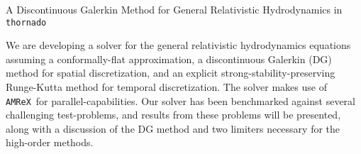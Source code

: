 \documentclass{article}
\newcommand{\thornado}{\texttt{thornado}}
\newcommand{\amrex}{\texttt{AMReX}}
\begin{document}
\begin{center}
A Discontinuous Galerkin Method for General Relativistic Hydrodynamics in \thornado
\end{center}

We are developing a solver for the general relativistic hydrodynamics equations assuming a conformally-flat approximation, a discontinuous Galerkin (DG) method for spatial discretization, and an explicit strong-stability-preserving Runge-Kutta method for temporal discretization. The solver makes use of \amrex\ for parallel-capabilities. Our solver has been benchmarked against several challenging test-problems, and results from these problems will be presented, along with a discussion of the DG method and two limiters necessary for the high-order methods.
\end{document}

